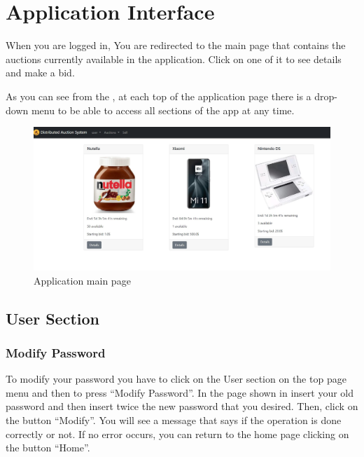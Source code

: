 \section{Application Interface}

When you are logged in, You are redirected to the main page that contains the
auctions currently available in the application. Click on one of it to see
details and make a bid.

As you can see from the , at each top of the application
page there is a drop-down menu to be able to access all sections of the app at
any time.

\begin{figure}[htb]
	\centering
	\includegraphics[width=1\textwidth]{img/main-page.jpg}
	\caption{Application main page}\label{fig:main-page}
\end{figure}

\subsection{User Section}

\subsubsection{Modify Password}

To modify your password you have to click on the User section on the top page
menu and then to press ``Modify Password''. In the page shown in
 insert your old password and then insert twice the new
password that you desired. Then, click on the button ``Modify''. You will see a
message that says if the operation is done correctly or not. If no error occurs,
you can return to the home page clicking on the button ``Home''.

